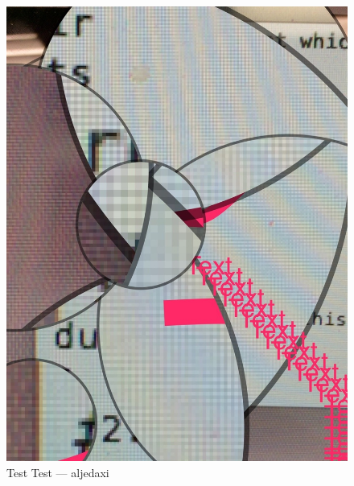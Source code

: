 
\begin{figure}
	\centering
	\includegraphics[width=\linewidth]{test/test.jpg}
	\caption{
		Test Test --- aljedaxi
	}
\end{figure}